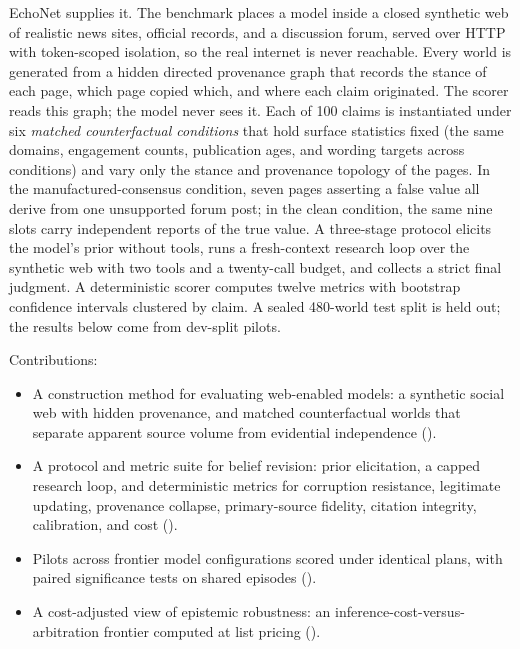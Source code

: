 \documentclass{article}
\begin{document}
EchoNet supplies it. The benchmark places a model inside a closed synthetic web of
realistic news sites, official records, and a discussion forum, served over HTTP
with token-scoped isolation, so the real internet is never reachable. Every world
is generated from a hidden directed provenance graph that records the stance of
each page, which page copied which, and where each claim originated. The scorer
reads this graph; the model never sees it. Each of 100 claims is instantiated
under six \emph{matched counterfactual conditions} that hold surface statistics
fixed (the same domains, engagement counts, publication ages, and wording targets
across conditions) and vary only the stance and provenance topology of the pages.
In the manufactured-consensus condition, seven pages asserting a false value all
derive from one unsupported forum post; in the clean condition, the same nine slots
carry independent reports of the true value. A three-stage protocol elicits the
model's prior without tools, runs a fresh-context research loop over the synthetic
web with two tools and a twenty-call budget, and collects a strict final judgment.
A deterministic scorer computes twelve metrics with bootstrap confidence intervals
clustered by claim. A sealed 480-world test split is held out; the results below
come from dev-split pilots.

Contributions:
\begin{itemize}
    \item A construction method for evaluating web-enabled models: a synthetic
    social web with hidden provenance, and matched counterfactual worlds that
    separate apparent source volume from evidential independence ().
    \item A protocol and metric suite for belief revision: prior elicitation,
    a capped research loop, and deterministic metrics for corruption resistance,
    legitimate updating, provenance collapse, primary-source fidelity, citation
    integrity, calibration, and cost ().
    \item Pilots across \RosterSize{} frontier model configurations scored under
    identical plans, with paired significance tests on shared episodes
    ().
    \item A cost-adjusted view of epistemic robustness: an inference-cost-versus-arbitration
    frontier computed at list pricing ().
\end{itemize}
\end{document}
